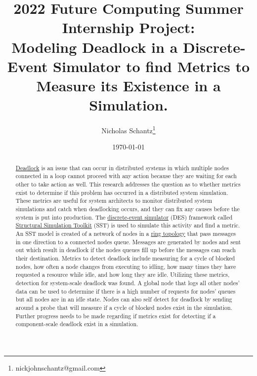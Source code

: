 \documentclass{article}
\begin{document}
%
%
%

    \begin{minipage}[h]{\textwidth}
        \title{2022 Future Computing Summer Internship Project:\\Modeling Deadlock in a Discrete-Event Simulator to find Metrics to Measure its Existence in a Simulation.}
        \author{Nicholas Schantz\footnote{nickjohnschantz@gmail.com}}
        \date{\today}
            \maketitle
        \begin{abstract}
            \href{https://en.wikipedia.org/wiki/Deadlock}{Deadlock} is an issue that can occur in distributed systems in which multiple nodes connected in a loop cannot proceed with any action because they are waiting for each other to take action as well. This research addresses the question as to whether metrics exist to determine if this problem has occurred in a distributed system simulation. These metrics are useful for system architects to monitor distributed system simulations and catch when deadlocking occurs, and they can fix any causes before the system is put into production. The \href{https://en.wikipedia.org/wiki/Discrete-event_simulation}{discrete-event simulator} (DES) framework called \href{http://sst-simulator.org/}{Structural Simulation Toolkit} (SST) is used to simulate this activity and find a metric. An SST model is created of a network of nodes in a \href{https://en.wikipedia.org/wiki/Ring_network}{ring topology} that pass messages in one direction to a connected nodes queue. Messages are generated by nodes and sent out which result in deadlock if the nodes queues fill up before the messages can reach their destination. Metrics to detect deadlock include measuring for a cycle of blocked nodes, how often a node changes from executing to idling, how many times they have requested a resource while idle, and how long they are idle. Utilizing these metrics, detection for system-scale deadlock was found. A global node that logs all other nodes' data can be used to determine if there is a high number of requests for nodes' queues but all nodes are in an idle state. Nodes can also self detect for deadlock by sending around a probe that will measure if a cycle of blocked nodes exist in the simulation. Further progress needs to be made regarding if metrics exist for detecting if a component-scale deadlock exist in a simulation.
            
        \end{abstract}
    \end{minipage}
\end{document}
